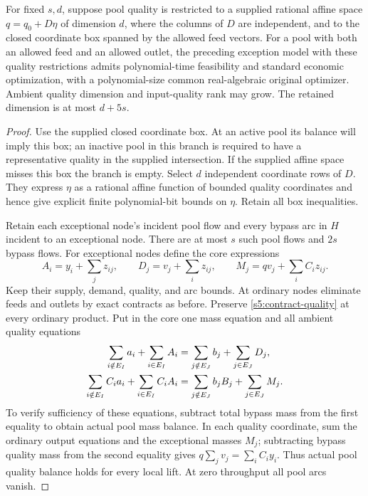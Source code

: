 \begin{lemma}
\label{s5:quality-chart}
For fixed $s,d$, suppose pool quality is restricted to a supplied rational
affine space $q=q_0+D\eta$ of dimension $d$, where the columns of $D$
are independent, and to the closed coordinate box spanned by the allowed
feed vectors. For a pool with both an allowed feed and an allowed outlet,
the preceding exception model with these quality restrictions admits polynomial-time
feasibility and standard economic optimization, with a polynomial-size
common real-algebraic original optimizer. Ambient quality dimension and
input-quality rank may grow. The retained dimension is at most $d+5s$.
\end{lemma}
\begin{proof}
Use the supplied closed coordinate box. At an active pool its balance
will imply this box; an inactive pool in this branch is required to have
a representative quality in the supplied intersection. If the
supplied affine space misses this box the branch is empty. Select $d$
independent coordinate rows of $D$. They express $\eta$ as a rational
affine function of bounded quality coordinates and hence give explicit
finite polynomial-bit bounds on $\eta$. Retain all box inequalities.

Retain each exceptional node's incident pool flow and every bypass arc
in $H$ incident to an exceptional node. There are at most $s$ such
pool flows and $2s$ bypass flows. For exceptional nodes define the core
expressions
\[
 A_i=y_i+\sum_jz_{ij},\qquad
 D_j=v_j+\sum_i z_{ij},\qquad M_j=qv_j+\sum_iC_i z_{ij}.
\]
Keep their supply, demand, quality, and arc bounds. At ordinary nodes
eliminate feeds and outlets by exact contracts as before. Preserve
\eqref{s5:contract-quality} at every ordinary product. Put in the core
one mass equation and all ambient quality equations
\begin{align}
 \sum_{i\notin E_I}a_i+\sum_{i\in E_I}A_i
 &=\sum_{j\notin E_J}b_j+\sum_{j\in E_J}D_j,\notag\\
 \sum_{i\notin E_I}C_i a_i+\sum_{i\in E_I}C_i A_i
 &=\sum_{j\notin E_J}b_jB_j+\sum_{j\in E_J}M_j.
 \label{s5:exception-balances}
\end{align}
To verify sufficiency of these equations, subtract total bypass mass
from the first equality to obtain actual pool mass balance. In each
quality coordinate, sum the ordinary output equations and the
exceptional masses $M_j$; subtracting bypass quality mass from the
second equality gives
$q\sum_jv_j=\sum_iC_i y_i$. Thus actual pool quality balance holds
for every local lift. At zero throughput all pool arcs vanish.


\end{proof}

